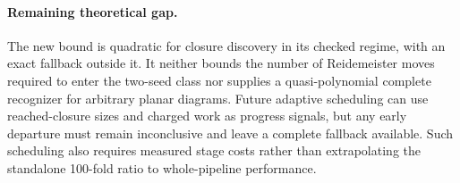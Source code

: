 \paragraph{Remaining theoretical gap.}
The new bound is quadratic for closure discovery in its checked regime,
with an exact fallback outside it. It neither bounds the number of
Reidemeister moves required to enter the two-seed class nor supplies a
quasi-polynomial complete recognizer for arbitrary planar diagrams.
Future adaptive scheduling can use reached-closure sizes and charged work
as progress signals, but any early departure must remain inconclusive and
leave a complete fallback available. Such scheduling also requires measured
stage costs rather than extrapolating the standalone 100-fold ratio to
whole-pipeline performance.
